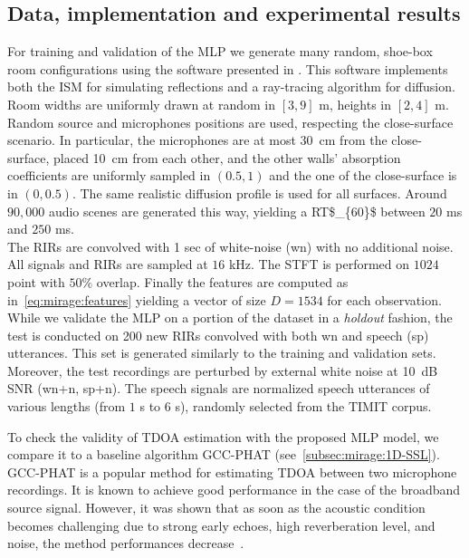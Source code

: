 \subsection{Data, implementation and experimental results}
For training and validation of the \ac{MLP} we generate many random, shoe-box room configurations using the software presented in .
This software implements both the \acf{ISM} for simulating reflections and a ray-tracing algorithm for diffusion.
Room widths are uniformly drawn at random in $[3, 9]$ m, heights in $[2, 4]$ m.
Random source and microphones positions are used, respecting the close-surface scenario.
In particular, the microphones are at most 30~cm from the close-surface, placed 10~cm from each other, and the other walls' absorption coefficients are uniformly sampled in $(0.5, 1)$ and the one of the close-surface is in $(0, 0.5)$.
The same realistic diffusion profile  is used for all surfaces.
Around $90,000$ audio scenes are generated this way, yielding a \ac{RT$_{60}$} between $20$ ms and $250$ ms.
\\The \acp{RIR} are convolved with 1 sec of white-noise (wn) with no additional noise.
All signals and \acp{RIR} are sampled at $16$ kHz.
The \ac{STFT} is performed on $1024$ point with $50\%$ overlap.
Finally the features are computed as in~\eqref{eq:mirage:features} yielding a vector of size $D = 1534$ for each observation.
\\While we validate the \ac{MLP} on a portion of the dataset in a \textit{holdout} fashion, the test is conducted on 200 new \acp{RIR} convolved with both wn and speech (sp) utterances.
This set is generated similarly to the training and validation sets.
Moreover, the test recordings are perturbed by external white noise at 10~dB \acf{SNR} (wn+n, sp+n).
The speech signals are normalized speech utterances of various lengths (from $1$ s to $6$ s), randomly selected from the TIMIT corpus.

\label{subsec:lantern:mlpdata}
To check the validity of \ac{TDOA} estimation with the proposed \ac{MLP} model, we compare it to a baseline algorithm \acf{GCC-PHAT} (see~\cref{subsec:mirage:1D-SSL}).
\ac{GCC-PHAT} is a popular method for estimating \ac{TDOA} between two microphone recordings.
It is known to achieve good performance in the case of the broadband source signal.
However, it was shown that as soon as the acoustic condition becomes challenging due to strong early echoes, high reverberation level, and noise, the method performances decrease~.


